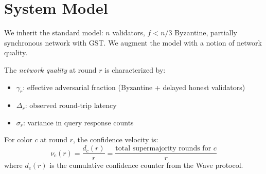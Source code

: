 \section{System Model}

\label{sec:ray-model}

We inherit the standard model: $n$ validators, $f < n/3$ Byzantine, partially
synchronous network with GST. We augment the model with a notion of network quality.

\begin{definition}
The \emph{network quality} at round $r$ is characterized by:
\begin{itemize}[nosep]
\item $\gamma_r$: effective adversarial fraction (Byzantine + delayed honest validators)
\item $\Delta_r$: observed round-trip latency
\item $\sigma_r$: variance in query response counts
\end{itemize}
\end{definition}

\begin{definition}
For color $c$ at round $r$, the confidence velocity is:
\[
\nu_c(r) = \frac{d_c(r)}{r} = \frac{\text{total supermajority rounds for } c}{r}
\]
where $d_c(r)$ is the cumulative confidence counter from the Wave protocol.
\end{definition}

